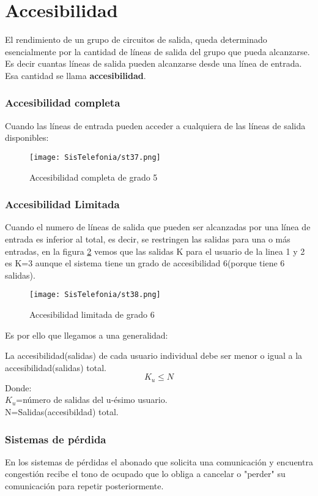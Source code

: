 \documentclass[11pt,fleqn]{book} %
\begin{document}
\section{Accesibilidad}
El rendimiento de un grupo de circuitos de salida, queda determinado esencialmente por la cantidad de líneas de salida del grupo que pueda alcanzarse.\\
Es decir cuantas líneas de salida pueden alcanzarse desde una línea de entrada. Esa cantidad se llama \textbf{accesibilidad}.
\subsubsection{Accesibilidad completa}
Cuando las líneas de entrada pueden acceder a cualquiera de las líneas de salida disponibles:
\begin{figure}[ht]
\centering\texttt{[image: SisTelefonia/st37.png]}
\caption{Accesibilidad completa de grado 5}
\label{fig:Accesibilidad completa}
\end{figure}
\subsubsection{Accesibilidad Limitada}
Cuando el numero de líneas de salida que pueden ser alcanzadas por una línea de entrada es inferior al total, es decir, se restringen las salidas para una o más entradas, en la figura \ref{fig:Accesibilidad limitada} vemos que las salidas K para el usuario de la linea 1 y 2 es K=3 aunque el sistema tiene un grado  de accesibilidad 6(porque tiene 6 salidas).
\begin{figure}[ht]
\centering\texttt{[image: SisTelefonia/st38.png]}
\caption{Accesibilidad limitada de grado 6}
\label{fig:Accesibilidad limitada}
\end{figure}
Es por ello que llegamos a una generalidad:
\begin{definition}
La accesibilidad(salidas) de cada usuario individual debe ser menor o igual a la accesibilidad(salidas) total.
\begin{equation}
K_u\leq N
\end{equation}
Donde:\\$K_u$=número de salidas del u-ésimo usuario.\\
N=Salidas(accesibildad) total.
\end{definition}
\subsubsection{Sistemas de pérdida}
En los sistemas de pérdidas el abonado que solicita una comunicación y encuentra congestión recibe el tono de ocupado que lo obliga a cancelar o "perder" su comunicación para repetir posteriormente.
\end{document}
